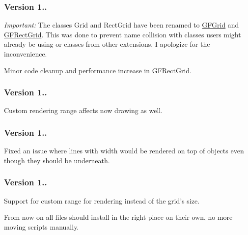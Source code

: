 \subsubsection*{Version 1..}

{\itshape Important\+:} The classes {\ttfamily Grid} and {\ttfamily Rect\+Grid} have been renamed to {\ttfamily \hyperlink{class_g_f_grid}{G\+F\+Grid}} and {\ttfamily \hyperlink{class_g_f_rect_grid}{G\+F\+Rect\+Grid}}. This was done to prevent name collision with classes users might already be using or classes from other extensions. I apologize for the inconvenience.
\begin{DoxyItemize}
\item Minor code cleanup and performance increase in {\ttfamily \hyperlink{class_g_f_rect_grid}{G\+F\+Rect\+Grid}}.
\end{DoxyItemize}

\subsubsection*{Version 1..}


\begin{DoxyItemize}
\item Custom rendering range affects now drawing as well.
\end{DoxyItemize}

\subsubsection*{Version 1..}


\begin{DoxyItemize}
\item Fixed an issue where lines with width would be rendered on top of objects even though they should be underneath.
\end{DoxyItemize}

\subsubsection*{Version 1..}


\begin{DoxyItemize}
\item Support for custom range for rendering instead of the grid's {\ttfamily size}.
\item From now on all files should install in the right place on their own, no more moving scripts manually.
\end{DoxyItemize}

